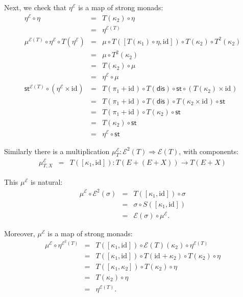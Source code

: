 \documentclass{LMCS}
\newcommand{\after}{\mathrel{\circ}}
\newcommand{\idmap}[1][]{\ensuremath{\mathrm{id}_{#1}}}
\newcommand{\st}{\ensuremath{\mathsf{st}}}
\newcommand{\dis}{\ensuremath{\mathsf{dis}}}
\newcommand{\E}{\ensuremath{\mathcal{E}}}
\begin{document}
{\noindent Next, we check that $\eta^{\E}$ is a map of strong 
monads:
$$\begin{array}{rcl}
\eta^{\E} \after \eta
& = &
T(\kappa_{2}) \after \eta \\
& = &
\eta^{\E(T)} \\
\mu^{\E(T)} \after \eta^{\E} \after T(\eta^{\E})
& = &
\mu \after T([T(\kappa_{1})\after\eta, \idmap]) \after T(\kappa_{2})
   \after T^{2}(\kappa_{2}) \\
& = &
\mu \after T^{2}(\kappa_{2}) \\
& = &
T(\kappa_{2}) \after \mu \\
& = &
\eta^{\E} \after \mu \\
\st^{\E(T)} \after (\eta^{\E}\times\idmap) 
& = &
T(\pi_{1}+\idmap) \after T(\dis) \after \st \after 
   (T(\kappa_{2})\times\idmap) \\
& = &
T(\pi_{1}+\idmap) \after T(\dis) \after T(\kappa_{2}\times\idmap) 
  \after \st \\
& = &
T(\pi_{1}+\idmap) \after T(\kappa_{2}) \after \st \\
& = &
T(\kappa_{2}) \after \st \\
& = &
\eta^{\E} \after \st
\end{array}$$

\noindent Similarly there is a multiplication $\mu^{\E}_{T}
\colon \E^{2}(T) \Rightarrow \E(T)$, with
components:
$$\begin{array}{rcl}
\mu^{\E}_{T,X} 
& = &
T([\kappa_{1},\idmap])\colon T(E + (E+X)) \longrightarrow T(E+X)
\end{array}$$

\noindent This $\mu^{\E}$ is natural:
$$\begin{array}{rcl}
\mu^{\E} \after \E^{2}(\sigma)
& = &
T([\kappa_{1},\idmap]) \after \sigma \\
& = &
\sigma \after S([\kappa_{1},\idmap]) \\
& = &
\E(\sigma) \after \mu^{\E}.
\end{array}$$

\noindent Moreover, $\mu^{\E}$ is a map of strong monads:
$$\begin{array}{rcl}
\mu^{\E} \after \eta^{\E^{2}(T)}
& = &
T([\kappa_{1},\idmap]) \after \E(T)(\kappa_{2}) \after
   \eta^{\E(T)} \\
& = &
T([\kappa_{1},\idmap]) \after T(\idmap+\kappa_{2}) \after
   T(\kappa_{2}) \after \eta \\
& = &
T([\kappa_{1},\kappa_{2}]) \after T(\kappa_{2}) \after \eta \\
& = &
T(\kappa_{2}) \after \eta \\
& = &
\eta^{\E(T)}.
\end{array}$$

}
\end{document}
